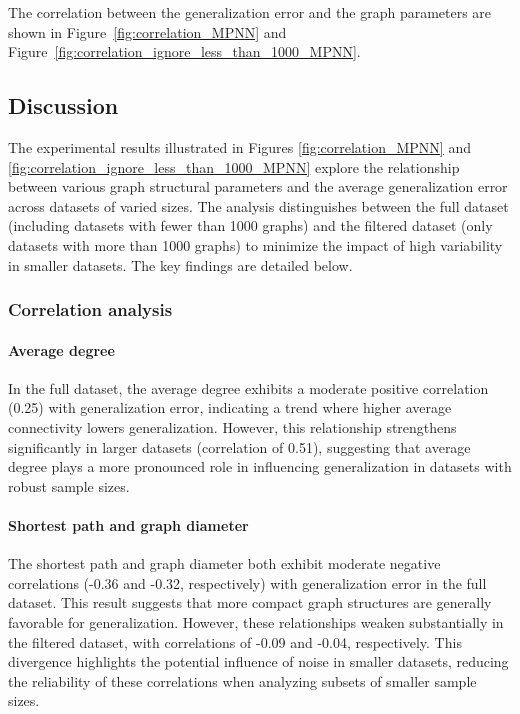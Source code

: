 The correlation between the generalization error and the graph parameters are shown in Figure~\ref{fig:correlation_MPNN} and Figure~\ref{fig:correlation_ignore_less_than_1000_MPNN}.

\subsection{Discussion}

The experimental results illustrated in Figures \ref{fig:correlation_MPNN} and \ref{fig:correlation_ignore_less_than_1000_MPNN} explore the relationship between various graph structural parameters and the average generalization error across datasets of varied sizes. The analysis distinguishes between the full dataset (including datasets with fewer than 1000 graphs) and the filtered dataset (only datasets with more than 1000 graphs) to minimize the impact of high variability in smaller datasets. The key findings are detailed below.

\subsubsection{Correlation analysis}

\paragraph{Average degree}
In the full dataset, the average degree exhibits a moderate positive correlation (0.25) with generalization error, indicating a trend where higher average connectivity lowers generalization. However, this relationship strengthens significantly in larger datasets (correlation of 0.51), suggesting that average degree plays a more pronounced role in influencing generalization in datasets with robust sample sizes.

\paragraph{Shortest path and graph diameter}
The shortest path and graph diameter both exhibit moderate negative correlations (-0.36 and -0.32, respectively) with generalization error in the full dataset. This result suggests that more compact graph structures are generally favorable for generalization. However, these relationships weaken substantially in the filtered dataset, with correlations of -0.09 and -0.04, respectively. This divergence highlights the potential influence of noise in smaller datasets, reducing the reliability of these correlations when analyzing subsets of smaller sample sizes.

